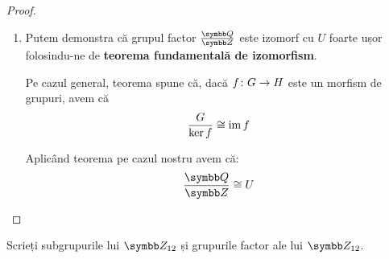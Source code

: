 \begin{proof}
\begin{enumerate}
    \item Putem demonstra că grupul factor \(\frac{\rationals}{\integers}\) este izomorf cu \(U\) foarte ușor folosindu-ne de \textbf{teorema fundamentală de izomorfism}.

    Pe cazul general, teorema spune că, dacă \(f \colon G \to H\) este un morfism de grupuri, avem că
    \[
        \frac{G}{\ker f} \cong \operatorname{im} f
    \]

    Aplicând teorema pe cazul nostru avem că:
    \[
        \frac{\rationals}{\integers} \cong U
    \]
\end{enumerate}
\end{proof}

\begin{exercise}
Scrieți subgrupurile lui \(\integersmod{12}\) și grupurile factor ale lui \(\integersmod{12}\).
\end{exercise}

